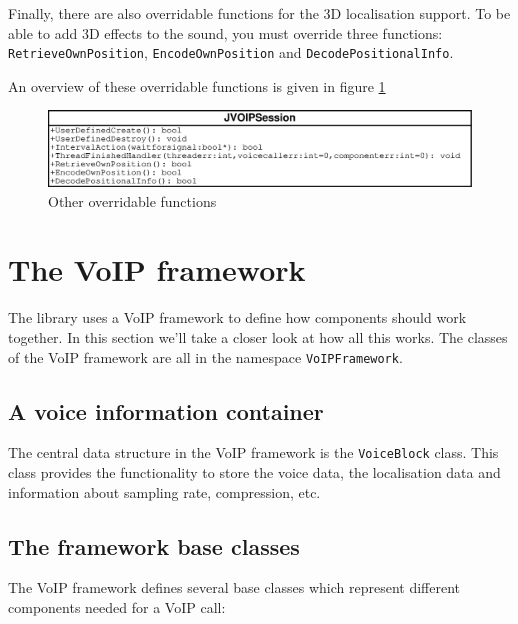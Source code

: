 		Finally, there are also overridable functions for the 3D localisation support.
		To be able to add 3D effects to the sound, you must override three functions:
		{\tt RetrieveOwnPosition}, {\tt EncodeOwnPosition} and {\tt Decode\-Positional\-Info}.
		
		An overview of these overridable functions is given in figure \ref{overridable-functions}
		\begin{figure}
			\center
			\includegraphics[width=\linewidth]{images/manual/chapter2/overridable-functions.eps}
			\caption{Other overridable functions}
			\label{overridable-functions}
		\end{figure}
		
	\section{The VoIP framework}\label{text-voipframework}
	
	The library uses a VoIP framework to define how components should work together.
	In this section we'll take a closer look at how all this works. The classes of the
	VoIP framework are all in the namespace {\tt VoIPFramework}.
	
		\subsection{A voice information container}
		
		The central data structure in the VoIP framework is the {\tt VoiceBlock} class.
		This class provides the functionality to store the voice data, the localisation
		data and information about sampling rate, compression, etc.
		
		\subsection{The framework base classes}
		
		The VoIP framework defines several base classes which represent different
		components needed for a VoIP call:
		
